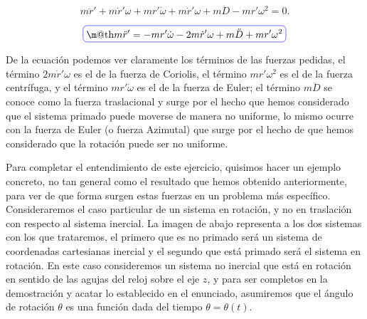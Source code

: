 \documentclass[a4paper,10pt]{article}
\makeatletter
\numberwithin{equation}{section}
\newcommand*{\boxcolor}{blue}
\renewcommand{\boxed}[1]{\textcolor{\boxcolor}{%
\tikz[baseline={([yshift=-1ex]current bounding box.center)}] \node [rectangle, minimum width=1ex,rounded corners,draw] {\normalcolor\m@th$\displaystyle#1$};}}
\makeatother
\begin{document}
\begin{equation}
 m\ddot{r}' + m\dot{r}'\omega + mr'\dot{\omega} + m \dot{r}' \omega  + m\ddot{D} 
 -  mr'\omega^2 = 0.
\end{equation}

\begin{equation}
 \boxed{m\ddot{r}' = - m r'\dot{\omega} - 2m \dot{r}' \omega + m\ddot{D} +  mr'\omega^2}
\label{eq:finalRotacionTraslacion}
 \end{equation}

De la ecuación  podemos ver claramente los términos 
de las fuerzas pedidas, el término $ 2m \dot{r}' \omega$ es el de la fuerza de Coriolis, 
el término $mr'\omega^2$ es el de la fuerza centrífuga, y el término $mr'\dot{\omega}$ 
es el de la fuerza de Euler; el término $m\ddot{D}$ se conoce como la fuerza traslacional 
y surge por el hecho que hemos considerado que el sistema primado puede moverse de 
manera no uniforme, lo mismo ocurre con la fuerza de Euler (o fuerza Azimutal) que surge 
por el hecho de que hemos considerado que la rotación puede ser no uniforme.

\vspace{.3cm}

Para completar el entendimiento de este ejercicio, quisimos hacer un ejemplo concreto, no 
tan general como el resultado que hemos obtenido anteriormente, para ver de que forma 
surgen estas fuerzas en un problema más específico. Consideraremos el caso particular 
de un sistema en rotación, y no en traslación con respecto al sistema inercial. La imagen de abajo representa a los dos sistemas con los que trataremos, el primero que 
es no primado será un sistema de coordenadas cartesianas inercial y el segundo que 
está primado será el sistema en rotación. En este caso consideremos un sistema 
no inercial que está en rotación en sentido de las agujas del reloj sobre el eje $z$, y para  ser completos
en la demostración y  acatar lo establecido en el enunciado,  asumiremos que el
ángulo de rotación $\theta$ es una función dada del tiempo $\theta = \theta(t)$.
\end{document}
